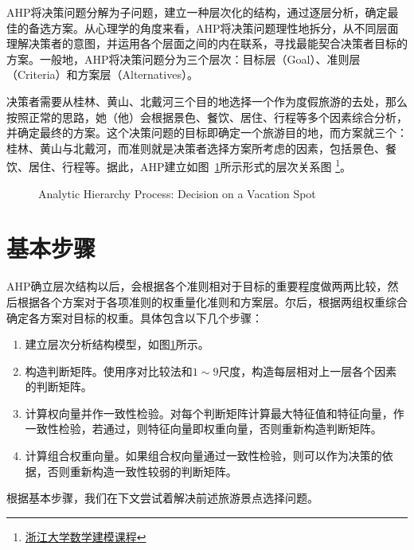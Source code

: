 AHP将决策问题分解为子问题，建立一种层次化的结构，通过逐层分析，确定最佳的备选方案。从心理学的角度来看，AHP将决策问题理性地拆分，从不同层面理解决策者的意图，并运用各个层面之间的内在联系，寻找最能契合决策者目标的方案。一般地，AHP将决策问题分为三个层次：目标层（Goal）、准则层（Criteria）和方案层（Alternatives）。

\begin{example}
决策者需要从桂林、黄山、北戴河三个目的地选择一个作为度假旅游的去处，那么按照正常的思路，她（他）会根据景色、餐饮、居住、行程等多个因素综合分析，并确定最终的方案。这个决策问题的目标即确定一个旅游目的地，而方案就三个：桂林、黄山与北戴河，而准则就是决策者选择方案所考虑的因素，包括景色、餐饮、居住、行程等。据此，AHP建立如图~\ref{fig:ahp}所示形式的层次关系图
\footnote{\href{http://www.math.zju.edu.cn/ligangliu/Courses/MathematicalModeling\_2005-2006/Syllabus/chapter\_12.pdf}{浙江大学数学建模课程}}。
\begin{figure}[htbp]
\centering
{}
\caption{Analytic Hierarchy Process: Decision on a Vacation Spot}
\label{fig:ahp}
\end{figure}
\end{example}

\section{基本步骤}
AHP确立层次结构以后，会根据各个准则相对于目标的重要程度做两两比较，然后根据各个方案对于各项准则的权重量化准则和方案层。尔后，根据两组权重综合确定各方案对目标的权重。具体包含以下几个步骤：
\begin{enumerate}[（1）]
\item 建立层次分析结构模型，如图\ref{fig:ahp}所示。
\item 构造判断矩阵。使用序对比较法和$1\sim 9$尺度，构造每层相对上一层各个因素的判断矩阵。
\item 计算权向量并作一致性检验。对每个判断矩阵计算最大特征值和特征向量，作一致性检验，若通过，则特征向量即权重向量，否则重新构造判断矩阵。
\item 计算组合权重向量。如果组合权向量通过一致性检验，则可以作为决策的依据，否则重新构造一致性较弱的判断矩阵。
\end{enumerate}
根据基本步骤，我们在下文尝试着解决前述旅游景点选择问题。

